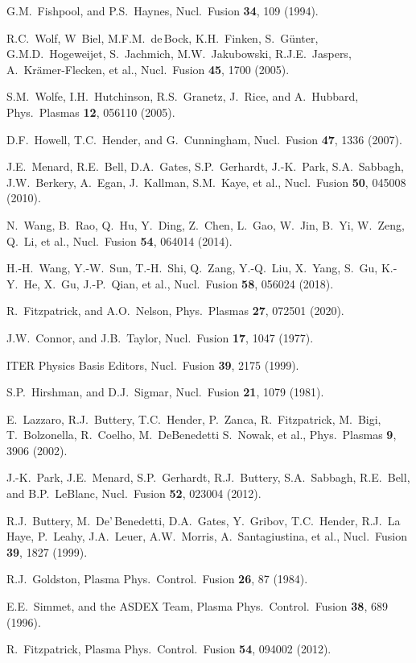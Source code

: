 \documentclass[12pt,prb,aps]{revtex4-1}
\begin{document}
\begin{thebibliography}{99}
 G.M.~Fishpool, and P.S.~Haynes, Nucl.\ Fusion {\bf 34}, 109 (1994).

 R.C.~Wolf, W~Biel, M.F.M.~de\,Bock, K.H.~Finken, S.~G\"{u}nter, G.M.D.~Hogeweijet,  S.~Jachmich, M.W.~Jakubowski, R.J.E.~Jaspers, A.~Kr\"{a}mer-Flecken, et al., Nucl.\ Fusion {\bf 45}, 1700 (2005).

 S.M.~Wolfe,  I.H.~Hutchinson, R.S.~Granetz, J.~Rice, and A.~Hubbard, Phys.\ Plasmas {\bf 12}, 056110 (2005).

 D.F.~Howell, T.C.~Hender, and G.~Cunningham, Nucl.\ Fusion {\bf 47}, 1336 (2007).

 J.E.~Menard, R.E.~Bell, D.A.~Gates, S.P.~Gerhardt, J.-K.~Park, S.A.~Sabbagh, J.W.~Berkery,
A.~Egan, J.~Kallman, S.M.~Kaye, et al., Nucl.\ Fusion {\bf 50}, 045008 (2010).

 N.~Wang, B.~Rao, Q.~Hu, Y.~Ding, Z.~Chen, L.~Gao, W.~Jin, B.~Yi, W.~Zeng, Q.~Li, et al., Nucl.\ Fusion {\bf 54}, 064014 (2014).

 H.-H.~Wang, Y.-W.~Sun, T.-H.~Shi, Q.~Zang, Y.-Q.~Liu, X.~Yang, 
S.~Gu, K.-Y.~He, X.~Gu, J.-P.~Qian, et al., Nucl.\ Fusion {\bf 58}, 056024 (2018).

 R.~Fitzpatrick, and A.O.~Nelson,  Phys.\ Plasmas {\bf 27}, 072501 (2020).

 J.W.~Connor, and J.B.~Taylor, Nucl.\ Fusion {\bf 17}, 1047 (1977).

 ITER Physics Basis Editors, Nucl.\ Fusion {\bf 39}, 2175 (1999). 

 S.P.~Hirshman, and D.J.~Sigmar, Nucl.\ Fusion {\bf 21}, 1079 (1981). 

 E.~Lazzaro, R.J.~Buttery, T.C.~Hender, P.~Zanca, R.~Fitzpatrick, 
M.~Bigi, T.~Bolzonella, R.~Coelho, M.~DeBenedetti S.~Nowak, et al., Phys.\ Plasmas {\bf 9}, 3906 (2002).

 J.-K.~Park, J.E.~Menard, S.P.~Gerhardt, R.J.~Buttery, S.A.~Sabbagh, R.E.~Bell, and B.P.~LeBlanc, Nucl.\ Fusion {\bf 52}, 023004 (2012).

 R.J.~Buttery, M.~De'\,Benedetti, D.A.~Gates, Y.~Gribov, T.C.~Hender, R.J.~La\,Haye, P.~Leahy, 
J.A.~Leuer, A.W.~Morris, A.~Santagiustina, et al., Nucl.\ Fusion {\bf 39}, 1827 (1999).

 R.J.~Goldston, Plasma Phys.\ Control.\ Fusion {\bf 26}, 87 (1984).

 E.E.~Simmet, and the ASDEX Team, Plasma Phys.\ Control.\ Fusion {\bf 38}, 689 (1996).

 R.~Fitzpatrick, Plasma Phys.\ Control.\ Fusion {\bf 54}, 094002 (2012).

\end{thebibliography}
\end{document}
